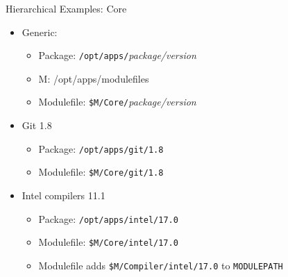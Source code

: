 \documentclass[dvipsnames,aspectratio=169]{beamer}
\begin{document}
\begin{frame}{Hierarchical Examples: Core}
  \begin{itemize}
    \item Generic:
      \begin{itemize}
        \item Package: \texttt{/opt/apps/}\emph{package/version}
        \item M: {\color{blue}/opt/apps/modulefiles}
        \item Modulefile: \texttt{{\color{blue}\$M}/Core/}\emph{package/version}
      \end{itemize}
    \item Git 1.8
      \begin{itemize}
        \item Package: \texttt{/opt/apps/git/1.8}
        \item Modulefile: \texttt{{\color{blue}\$M}/Core/git/1.8}
      \end{itemize}
    \item Intel compilers 11.1
      \begin{itemize}
        \item Package: \texttt{/opt/apps/intel/17.0}
        \item Modulefile: \texttt{{\color{blue}\$M}/Core/intel/17.0}
        \item Modulefile adds \texttt{{\color{blue}\$M}/Compiler/intel/17.0} to \texttt{MODULEPATH}
      \end{itemize}
  \end{itemize}
\end{frame}
\end{document}
